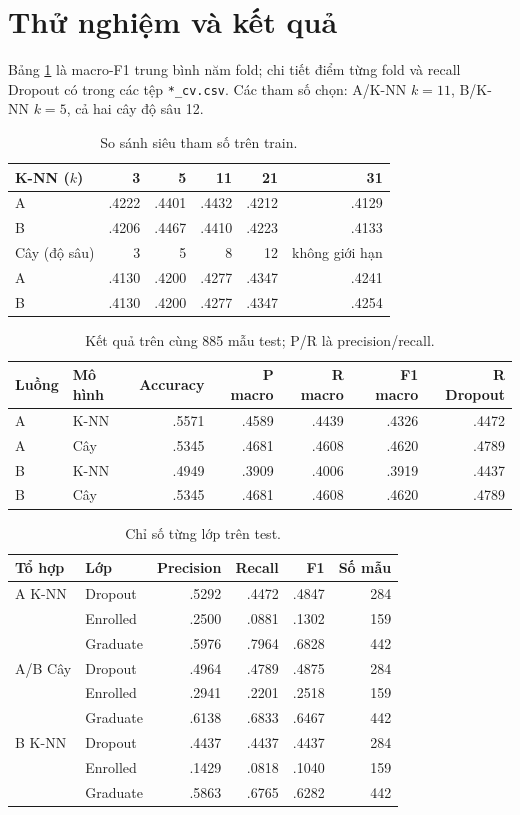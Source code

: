\documentclass[11pt,a4paper]{article}
\begin{document}
\section{Thử nghiệm và kết quả}
Bảng \ref{tab:cv} là macro-F1 trung bình năm fold; chi tiết điểm từng fold và recall Dropout có trong các tệp \texttt{*\_cv.csv}. Các tham số chọn: A/K-NN $k=11$, B/K-NN $k=5$, cả hai cây độ sâu 12.
\begin{table}[H]\centering\small
\begin{tabular}{lrrrrr}\toprule
K-NN ($k$) & 3 & 5 & 11 & 21 & 31\\\midrule
A & .4222 & .4401 & .4432 & .4212 & .4129\\
B & .4206 & .4467 & .4410 & .4223 & .4133\\\midrule
Cây (độ sâu) & 3 & 5 & 8 & 12 & không giới hạn\\\midrule
A & .4130 & .4200 & .4277 & .4347 & .4241\\
B & .4130 & .4200 & .4277 & .4347 & .4254\\\bottomrule
\end{tabular}\caption{So sánh siêu tham số trên train.}\label{tab:cv}\end{table}
\begin{table}[H]\centering\small
\begin{tabular}{llrrrrr}\toprule
Luồng & Mô hình & Accuracy & P macro & R macro & F1 macro & R Dropout\\\midrule
A & K-NN & .5571 & .4589 & .4439 & .4326 & .4472\\
A & Cây & .5345 & .4681 & .4608 & .4620 & .4789\\
B & K-NN & .4949 & .3909 & .4006 & .3919 & .4437\\
B & Cây & .5345 & .4681 & .4608 & .4620 & .4789\\\bottomrule
\end{tabular}\caption{Kết quả trên cùng 885 mẫu test; P/R là precision/recall.}\label{tab:test}\end{table}
\begin{table}[H]\centering\small
\begin{tabular}{llrrrr}\toprule
Tổ hợp & Lớp & Precision & Recall & F1 & Số mẫu\\\midrule
A K-NN & Dropout & .5292 & .4472 & .4847 & 284\\
 & Enrolled & .2500 & .0881 & .1302 & 159\\
 & Graduate & .5976 & .7964 & .6828 & 442\\\midrule
A/B Cây & Dropout & .4964 & .4789 & .4875 & 284\\
 & Enrolled & .2941 & .2201 & .2518 & 159\\
 & Graduate & .6138 & .6833 & .6467 & 442\\\midrule
B K-NN & Dropout & .4437 & .4437 & .4437 & 284\\
 & Enrolled & .1429 & .0818 & .1040 & 159\\
 & Graduate & .5863 & .6765 & .6282 & 442\\\bottomrule
\end{tabular}\caption{Chỉ số từng lớp trên test.}\end{table}
\end{document}
